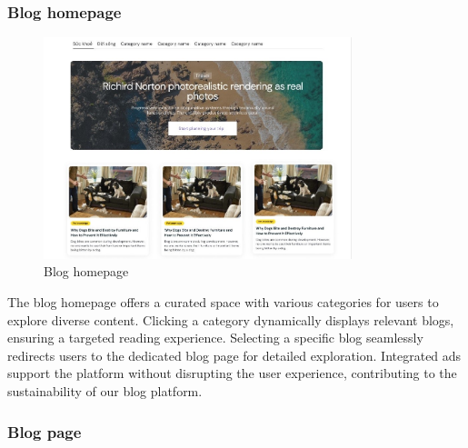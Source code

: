 \subsubsection{Blog homepage}
\begin{figure}[H]
    \centering
    \includegraphics[width=0.8\textwidth]{Figures/blog_ui.jpg}
    \caption{Blog homepage}
\end{figure}

The blog homepage offers a curated space with various categories for users to explore diverse content. Clicking a category dynamically displays relevant blogs, ensuring a targeted reading experience. Selecting a specific blog seamlessly redirects users to the dedicated blog page for detailed exploration. Integrated ads support the platform without disrupting the user experience, contributing to the sustainability of our blog platform.

\subsubsection{Blog page}


